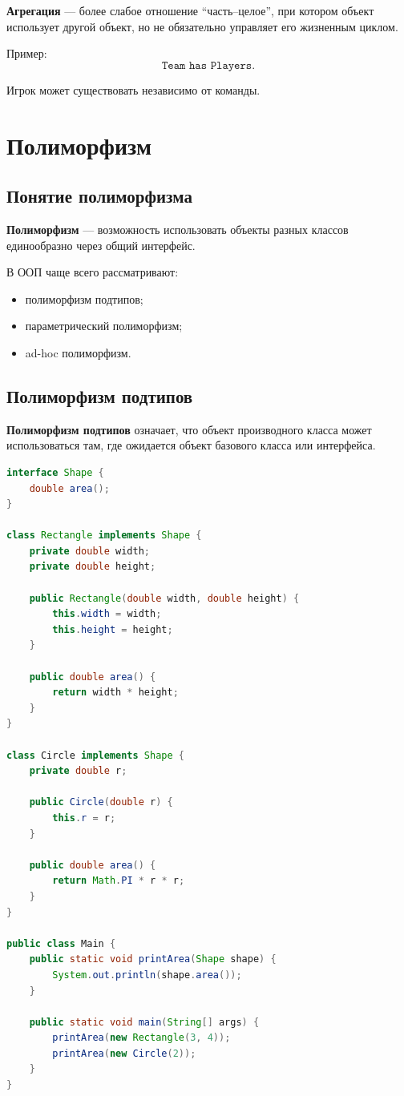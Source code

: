 \documentclass[12pt,a4paper]{article}
\begin{document}
\textbf{Агрегация} --- более слабое отношение ``часть--целое'', при котором объект использует другой объект, но не обязательно управляет его жизненным циклом.

Пример:
\[
\texttt{Team has Players}.
\]

Игрок может существовать независимо от команды.

\section{Полиморфизм}

\subsection{Понятие полиморфизма}

\textbf{Полиморфизм} --- возможность использовать объекты разных классов единообразно через общий интерфейс.

В ООП чаще всего рассматривают:
\begin{itemize}
    \item полиморфизм подтипов;
    \item параметрический полиморфизм;
    \item ad-hoc полиморфизм.
\end{itemize}

\subsection{Полиморфизм подтипов}

\textbf{Полиморфизм подтипов} означает, что объект производного класса может использоваться там, где ожидается объект базового класса или интерфейса.

\begin{lstlisting}[language=Java,caption={Полиморфизм подтипов}]
interface Shape {
    double area();
}

class Rectangle implements Shape {
    private double width;
    private double height;

    public Rectangle(double width, double height) {
        this.width = width;
        this.height = height;
    }

    public double area() {
        return width * height;
    }
}

class Circle implements Shape {
    private double r;

    public Circle(double r) {
        this.r = r;
    }

    public double area() {
        return Math.PI * r * r;
    }
}

public class Main {
    public static void printArea(Shape shape) {
        System.out.println(shape.area());
    }

    public static void main(String[] args) {
        printArea(new Rectangle(3, 4));
        printArea(new Circle(2));
    }
}
\end{lstlisting}
\end{document}
